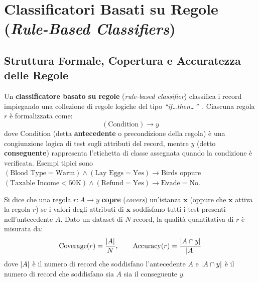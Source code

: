\FloatBarrier

\FloatBarrier
\section{Classificatori Basati su Regole (\textit{Rule-Based Classifiers})}
\label{sec:dm-rule-based}

\FloatBarrier
\subsection{Struttura Formale, Copertura e Accuratezza delle Regole}
\label{subsec:dm-rule-structure}

Un \textbf{classificatore basato su regole} (\textit{rule-based classifier}) classifica i record impiegando una collezione di regole logiche del tipo \textit{``if\dots{}then\dots''}~\cite{tan2018}. Ciascuna regola $r$ \`e formalizzata come:
\begin{equation}
    (\text{Condition}) \longrightarrow y
\end{equation}
dove $\text{Condition}$ (detta \textbf{antecedente} o precondizione della regola) \`e una congiunzione logica di test sugli attributi del record, mentre $y$ (detto \textbf{conseguente}) rappresenta l'etichetta di classe assegnata quando la condizione \`e verificata. Esempi tipici sono $(\text{Blood Type} = \text{Warm}) \wedge (\text{Lay Eggs} = \text{Yes}) \rightarrow \text{Birds}$ oppure $(\text{Taxable Income} < 50\text{K}) \wedge (\text{Refund} = \text{Yes}) \rightarrow \text{Evade} = \text{No}$.

\begin{definition}
Si dice che una regola $r : A \rightarrow y$ \textbf{copre} (\textit{covers}) un'istanza $\mathbf{x}$ (oppure che $\mathbf{x}$ attiva la regola $r$) se i valori degli attributi di $\mathbf{x}$ soddisfano tutti i test presenti nell'antecedente $A$. Dato un dataset di $N$ record, la qualit\`a quantitativa di $r$ \`e misurata da:
\begin{equation}
    \text{Coverage}(r) = \frac{\left|A\right|}{N}, \qquad \text{Accuracy}(r) = \frac{\left|A \cap y\right|}{\left|A\right|}
\end{equation}
dove $\left|A\right|$ \`e il numero di record che soddisfano l'antecedente $A$ e $\left|A \cap y\right|$ \`e il numero di record che soddisfano sia $A$ sia il conseguente $y$.
\end{definition}

